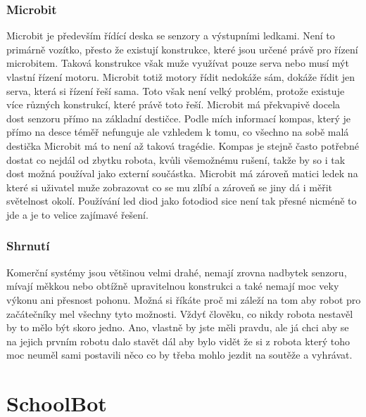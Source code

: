 \documentclass{template/socthesis}
\begin{document}
\subsection{Microbit}
Microbit je především řídící deska se senzory a výstupními ledkami. Není to primárně vozítko, přesto že existují konstrukce, které jsou určené právě pro řízení microbitem. Taková konstrukce však muže využívat pouze serva nebo musí mýt vlastní řízení motoru. Microbit totiž motory řídit nedokáže sám, dokáže řídit jen serva, která si řízení řeší sama. Toto však není velký problém, protože existuje více různých konstrukcí, které právě toto řeší. Microbit má překvapivě docela dost senzoru přímo na základní destičce. Podle mích informací kompas, který je přímo na desce téměř nefunguje ale vzhledem k tomu, co všechno na sobě malá destička Microbit má to není až taková tragédie. Kompas je stejně často potřebné dostat co nejdál od zbytku robota, kvůli všemožnému rušení, takže by so i tak dost možná používal jako externí součástka.
Microbit má zároveň matici ledek na které si uživatel muže zobrazovat co se mu zlíbí a zároveň se jiny dá i měřit světelnost okolí. Používání led diod jako fotodiod sice není tak přesné nicméně to jde a je to velice zajímavé řešení.

\subsection{Shrnutí}
Komerční systémy jsou většinou velmi drahé, nemají zrovna nadbytek senzoru, mívají měkkou nebo obtížně upravitelnou konstrukci a také nemají moc veky výkonu ani přesnost pohonu.
Možná si říkáte proč mi záleží na tom aby robot pro začátečníky mel všechny tyto možnosti. Vždyť člověku, co nikdy robota nestavěl by to mělo být skoro jedno. Ano, vlastně by jste měli pravdu, ale já chci aby se na jejich prvním robotu dalo stavět dál aby bylo vidět že si z robota který toho moc neuměl sami postavili něco co by třeba mohlo jezdit na soutěže a vyhrávat.

\chapter{SchoolBot}
\end{document}
